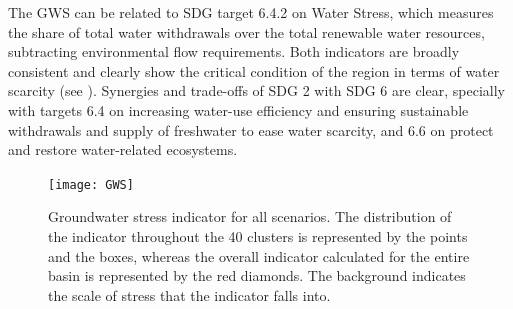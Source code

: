 The GWS can be related to SDG target 6.4.2 on Water Stress, which measures the share of total water withdrawals over the total renewable water resources, subtracting environmental flow requirements. Both indicators are broadly consistent and clearly show the critical condition of the region in terms of water scarcity (see ). Synergies and trade-offs of SDG 2 with SDG 6 are clear, specially with targets 6.4 on increasing water-use efficiency and ensuring sustainable withdrawals and supply of freshwater to ease water scarcity, and 6.6 on protect and restore water-related ecosystems.

\begin{figure}[!t]
	\centering
	\texttt{[image: GWS]}
	\caption{Groundwater stress indicator for all scenarios. The distribution of the indicator throughout the 40 clusters is represented by the points and the boxes, whereas the overall indicator calculated for the entire basin is represented by the red diamonds. The background indicates the scale of stress that the indicator falls into.}
	\label{fig:gws}
\end{figure}


